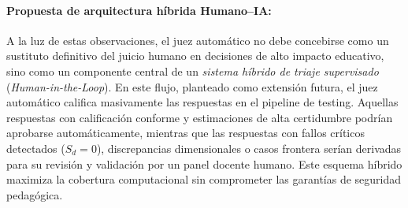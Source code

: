\paragraph{Propuesta de arquitectura híbrida Humano--IA:}
A la luz de estas observaciones, el juez automático no debe concebirse como un sustituto definitivo del juicio humano en decisiones de alto impacto educativo, sino como un componente central de un \textit{sistema híbrido de triaje supervisado} (\textit{Human-in-the-Loop}). En este flujo, planteado como extensión futura, el juez automático califica masivamente las respuestas en el pipeline de testing. Aquellas respuestas con calificación conforme y estimaciones de alta certidumbre podrían aprobarse automáticamente, mientras que las respuestas con fallos críticos detectados ($S_d = 0$), discrepancias dimensionales o casos frontera serían derivadas para su revisión y validación por un panel docente humano. Este esquema híbrido maximiza la cobertura computacional sin comprometer las garantías de seguridad pedagógica.


